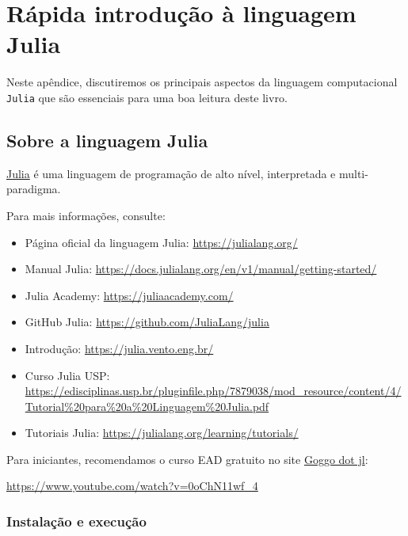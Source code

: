 
\chapter{Rápida introdução à linguagem Julia}\label{cap:julia}

Neste apêndice, discutiremos os principais aspectos da linguagem computacional \verb+Julia+ que são essenciais para uma boa leitura deste livro.

\section{Sobre a linguagem Julia}

\href{https://julialang.org/}{Julia} é uma linguagem de programação de alto nível, interpretada e multi-paradigma. 

Para mais informações, consulte:
\begin{itemize}
\item Página oficial da linguagem Julia: \url{https://julialang.org/}
\item Manual Julia: \url{https://docs.julialang.org/en/v1/manual/getting-started/}
\item Julia Academy: \url{https://juliaacademy.com/}
\item GitHub Julia: \url{https://github.com/JuliaLang/julia}
\item Introdução: \url{https://julia.vento.eng.br/}
\item Curso Julia USP: \url{https://edisciplinas.usp.br/pluginfile.php/7879038/mod_resource/content/4/Tutorial%20para%20a%20Linguagem%20Julia.pdf}
\item Tutoriais Julia: \url{https://julialang.org/learning/tutorials/}
\end{itemize}

Para iniciantes, recomendamos o curso EAD gratuito no site \href{https://www.youtube.com/watch?v=0oChN11wf_4}{Goggo dot jl}:
\begin{center}
  \url{https://www.youtube.com/watch?v=0oChN11wf_4}
\end{center}

\subsection{Instalação e execução}

